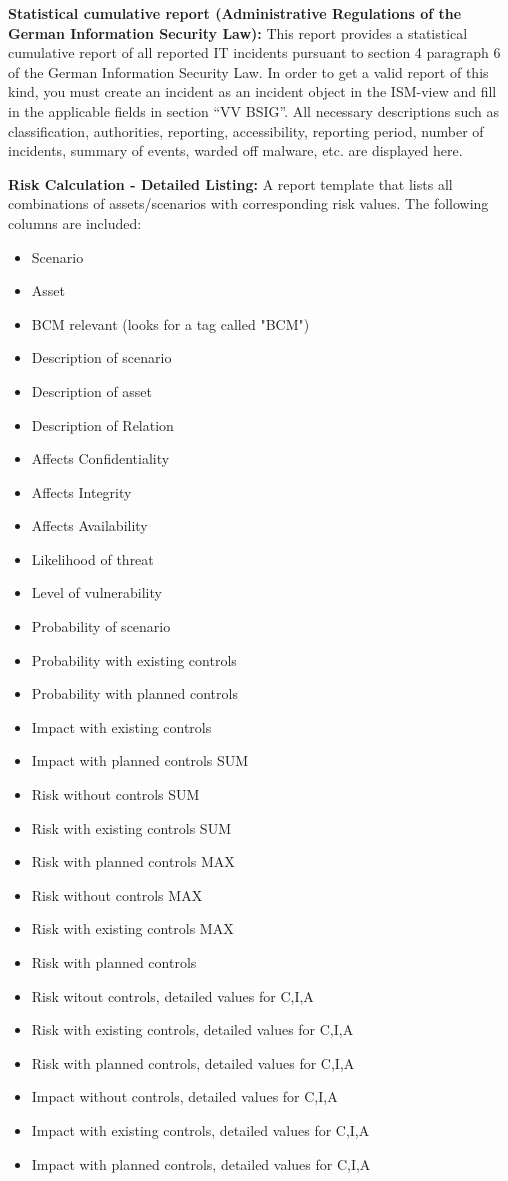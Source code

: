 \documentclass[a4paper,10pt]{book}
\begin{document}
\textbf{Statistical cumulative report (Administrative Regulations of the German
Information Security Law):} This report provides a statistical cumulative report
of all reported IT incidents pursuant to section 4 paragraph 6 of the German
Information Security Law. In order to get a valid report of this kind, you must
create an incident as an incident object in the ISM-view and fill in the
applicable fields in section ``VV BSIG''. All necessary descriptions such as
classification, authorities, reporting, accessibility, reporting period, number
of incidents, summary of events, warded off malware, etc. are displayed here.

\textbf{Risk Calculation - Detailed Listing:} A report template that lists all
combinations of assets/scenarios with corresponding risk values. The following
columns are included:

\begin{itemize}
\item Scenario
\item Asset
\item BCM relevant (looks for a tag called "BCM")
\item Description of scenario
\item Description of asset
\item Description of Relation
\item Affects Confidentiality
\item Affects Integrity
\item Affects Availability
\item Likelihood of threat
\item Level of vulnerability
\item Probability of scenario
\item Probability with existing controls
\item Probability with planned controls
\item Impact with existing controls
\item Impact with planned controls SUM
\item Risk without controls SUM
\item Risk with existing controls SUM
\item Risk with planned controls MAX
\item Risk without controls MAX
\item Risk with existing controls MAX
\item Risk with planned controls
\item Risk witout controls, detailed values for C,I,A
\item Risk with existing controls, detailed values for C,I,A
\item Risk with planned controls, detailed values for C,I,A
\item Impact without controls, detailed values for C,I,A
\item Impact with existing controls, detailed values for C,I,A
\item Impact with planned controls, detailed values for C,I,A
\end{itemize}
\end{document}
